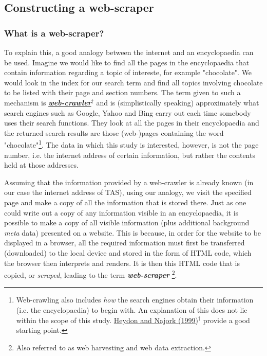 \documentclass{article}
\begin{document}
\subsection{Constructing a web-scraper}
\label{sec-3-3}


\subsubsection{What is a web-scraper?}
\label{sec-3-3-1}

To explain this, a good analogy between the internet and an encyclopaedia can be used. Imagine we would like to find all the pages in the encyclopaedia that contain information regarding a topic of intereste, for example "chocolate". We would look in the index for our search term and find all topics involving chocolate to be listed with their page and section numbers. The term given to such a mechanism is \textbf{\href{https://en.wikipedia.org/wiki/Web_crawler}{\emph{web-crawler$^{\dag{}}$}}} and is (simplistically speaking) approximately what search engines such as Google, Yahoo and Bing carry out each time somebody uses their search functions. They look at all the pages in their encyclopaedia and the returned search results are those (web-)pages containing the word "chocolate"\footnote{Web-crawling also includes \emph{how} the search engines obtain their information (i.e. the encyclopaedia) to begin with. An explanation of this does not lie within the scope of this study. \href{http://link.springer.com/article/10.1023/A:1019213109274}{Heydon and Najork (1999)$^{\dag{}}$} provide a good starting point.}. The data in which this study is interested, however, is not the page number, i.e. the internet address of certain information, but rather the contents held at those addresses.

Assuming that the information provided by a web-crawler is already known (in our case the internet address of TAS), using our analogy, we visit the specified page and make a copy of all the information that is stored there. Just as one could write out a copy of any information visible in an encyclopaedia, it is possible to make a copy of all visible information (plus additional background \emph{meta} data) presented on a website. This is because, in order for the website to be displayed in a browser, all the required information must first be transferred (downloaded) to the local device and stored in the form of HTML code, which the browser then interprets and renders. It is then this HTML code that is copied, or \emph{scraped}, leading to the term \textbf{\emph{web-scraper}} \footnote{Also referred to as web harvesting and web data extraction.}.
\end{document}

